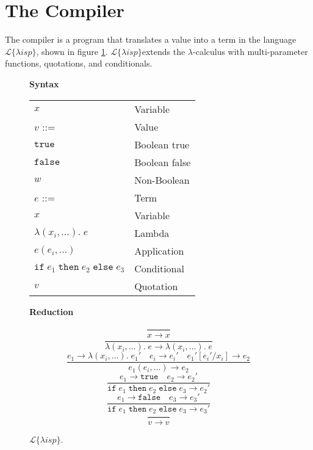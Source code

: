 \documentclass[a4paper]{article}
\newcommand{\lisp}{\ensuremath{\mathcal{L}\{\lambda isp\}}}
\begin{document}
\section{The Compiler}

The compiler is a program that translates a value into a term in the language \lisp, shown in figure \ref{fig:lisp}. \lisp extends the $\lambda$-calculus with multi-parameter functions, quotations, and conditionals.

\begin{figure}[h]
\label{fig:lisp}
\caption{\lisp.}

{\bf Syntax}

\begin{tabular}{ll}
$x$ & Variable \\
$v$ ::= & Value \\
\hspace{1em} $\mathtt{true}$ & \hspace{1em} Boolean true \\
\hspace{1em} $\mathtt{false}$ & \hspace{1em} Boolean false \\
\hspace{1em} $w$ & \hspace{1em} Non-Boolean \\
$e$ ::= & Term \\
\hspace{1em} $x$ & \hspace{1em} Variable \\
\hspace{1em} $\lambda(x_i, \dots).\;e$ & \hspace{1em} Lambda \\
\hspace{1em} $e(e_i, \dots)$ & \hspace{1em} Application \\
\hspace{1em} $\mathtt{if}\;e_1\;\mathtt{then}\;e_2\;\mathtt{else}\;e_3$ & \hspace{1em} Conditional \\
\hspace{1em} $v$ & \hspace{1em} Quotation \\
\end{tabular}

\hrulefill

{\bf Reduction}

$$\frac{}{x \rightarrow x}$$
$$\frac{}{\lambda(x_i, \dots).\;e \rightarrow \lambda(x_i, \dots).\;e}$$
$$\frac{e_1 \rightarrow \lambda(x_i, \dots).\;e_1' \quad e_i \rightarrow e_i' \quad e_1'[e_i' / x_i] \rightarrow e_2}{e_1(e_i, \dots) \rightarrow e_2}$$
$$\frac{e_1 \rightarrow \mathtt{true} \quad e_2 \rightarrow e_2'}{\mathtt{if}\;e_1\;\mathtt{then}\;e_2\;\mathtt{else}\;e_3 \rightarrow e_2'}$$
$$\frac{e_1 \rightarrow \mathtt{false} \quad e_3 \rightarrow e_3'}{\mathtt{if}\;e_1\;\mathtt{then}\;e_2\;\mathtt{else}\;e_3 \rightarrow e_3'}$$
$$\frac{}{v \rightarrow v}$$

\end{figure}
\end{document}
